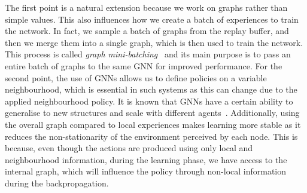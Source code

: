 \documentclass[conference]{IEEEtran}
\begin{document}
The first point is a natural extension because we work on graphs rather than simple values.
This also influences how we create a batch of experiences to train the network.
 In fact, we sample a batch of graphs from the replay buffer,
 and then we merge them into a single graph,
 which is then used to train the network.
 This process is called \emph{graph mini-batching}~\cite{DBLP:journals/corr/abs-1903-02428,wang2019deep}
 and its main purpose is to pass an entire batch of graphs to the same \ac{GNN} for improved performance.
%
For the second point,
 the use of \acp{GNN} allows us to define policies on a variable neighbourhood, which is essential in such systems as this can change due to the applied neighbourhood policy.
 It is known that \acp{GNN} have a certain ability to generalise to new structures and scale with different agents~\cite{DBLP:journals/aiopen/ZhouCHZYLWLS20,DBLP:conf/nips/KnyazevTA19}. 
% 
Additionally, 
 using the overall graph compared to local experiences makes learning more stable as it reduces the non-stationarity of the environment perceived by each node.
% 
This is because, even though the actions are produced using only local and neighbourhood information, 
 during the learning phase, we have access to the internal graph, 
 which will influence the policy through non-local information 
 during the backpropagation.
%
\end{document}
